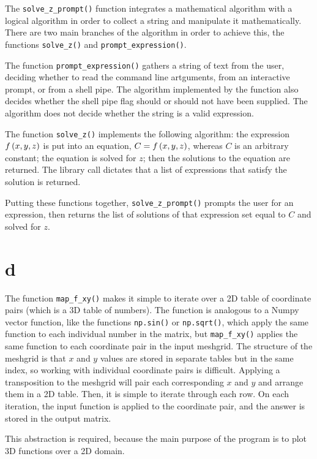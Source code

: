 \documentclass[11pt]{article}
\begin{document}
The \verb|solve_z_prompt()| function integrates a mathematical algorithm with a logical algorithm in order to collect a string
and manipulate it mathematically. There are two main branches of the algorithm in order to achieve this, the functions
\verb|solve_z()| and \verb|prompt_expression()|.\double

The function \verb|prompt_expression()| gathers a string of text from the user, deciding whether to read the command line artguments,
from an interactive prompt, or from a shell pipe. The algorithm implemented by the function also decides whether the shell pipe
flag should or should not have been supplied. The algorithm does not decide whether the string is a valid expression.\double

The function \verb|solve_z()| implements the following algorithm: the expression $f\left({x,y,z}\right)$ is put into an
equation, $C=f\left({x,y,z}\right)$, whereas $C$ is an arbitrary constant; the equation is solved for $z$; then the solutions to the
equation are returned. The library call dictates that a list of expressions that satisfy the solution is returned.\double

Putting these functions together, \verb|solve_z_prompt()| prompts the user for an expression, then returns the list of solutions
of that expression set equal to $C$ and solved for $z$.\double

\section{d}


The function \verb|map_f_xy()| makes it simple to iterate over a 2D table of coordinate pairs (which is a 3D table of numbers).
The function is analogous to a Numpy vector function, like the functions \verb|np.sin()| or \verb|np.sqrt()|, which apply the
same function to each individual number in the matrix, but \verb|map_f_xy()| applies the same function to each coordinate pair
in the input meshgrid. The structure of the meshgrid is that $x$ and $y$ values are stored in separate tables but in the same
index, so working with individual coordinate pairs is difficult. Applying a transposition to the meshgrid will pair each
corresponding $x$ and $y$ and arrange them in a 2D table. Then, it is simple to iterate through each row. On each iteration,
the input function is applied to the coordinate pair, and the answer is stored in the output matrix.\double

This abstraction is required, because the main purpose of the program is to plot 3D functions over a 2D domain.
\end{document}
